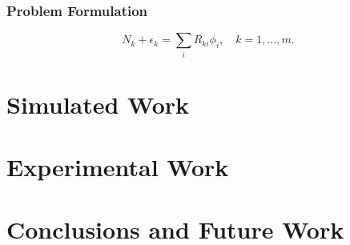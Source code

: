 \documentclass[fleqn]{beamer}
\begin{document}
\begin{frame}
\frametitle{Problem Formulation}
\begin{equation}
\label{eqn:disc-response}
N_k + \epsilon_k = \sum_i R_{ki} \phi_i, \quad k = 1,\ldots, m .
\end{equation}
\end{frame}




\section{Simulated Work}

\section{Experimental Work}

\section{Conclusions and Future Work}
\end{document}
